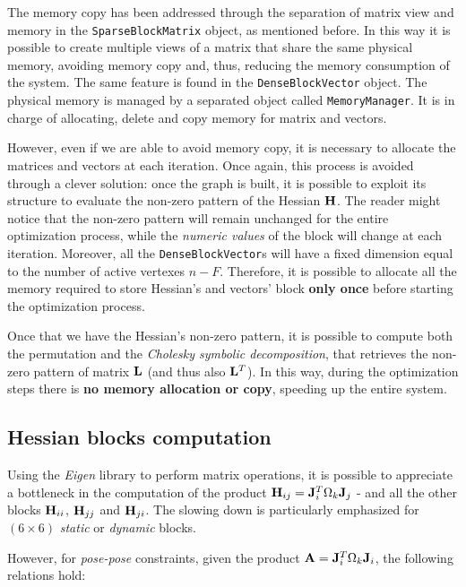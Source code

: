 The memory copy has been addressed through the separation of matrix view and memory in the \texttt{SparseBlockMatrix} object, as mentioned before. In this way it is possible to create multiple views of a matrix that share the same physical memory, avoiding memory copy and, thus, reducing the memory consumption of the system. The same feature is found in the \texttt{DenseBlockVector} object. The physical memory is managed by a separated object called \texttt{MemoryManager}. It is in charge of allocating, delete and copy memory for matrix and vectors.

However, even if we are able to avoid memory copy, it is necessary to allocate the matrices and vectors at each iteration. Once again, this process is avoided through a clever solution: once the graph is built, it is possible to exploit its structure to evaluate the non-zero pattern of the Hessian $\mathbf{H}$. The reader might notice that the non-zero pattern will remain unchanged for the entire optimization process, while the \textit{numeric values} of the block will change at each iteration. Moreover, all the \texttt{DenseBlockVector}s will have a fixed dimension equal to the number of active vertexes $n - F$. Therefore, it is possible to allocate all the memory required to store Hessian's and vectors' block \textbf{only once} before starting the optimization process.

Once that we have the Hessian's non-zero pattern, it is possible to compute both the permutation and the \textit{Cholesky symbolic decomposition}, that retrieves the non-zero pattern of matrix $\mathbf{L}$ (and thus also $\mathbf{L}^T$). In this way, during the optimization steps there is \textbf{no memory allocation or copy}, speeding up the entire system.

\subsection{Hessian blocks computation}\label{subsec:j_omega_j}
Using the \textit{Eigen} library to perform matrix operations, it is possible to appreciate a bottleneck in the computation of the product $\mathbf{H}_{ij} = \mathbf{J}_i^T \Omega_k \mathbf{J}_j$ - and all the other blocks $\mathbf{H}_{ii}$, $\mathbf{H}_{jj}$ and $\mathbf{H}_{ji}$. The slowing down is particularly emphasized for $(6\times6)$ \textit{static} or \textit{dynamic} blocks.

However, for \textit{pose-pose} constraints, given the product $\mathbf{A} = \mathbf{J}_i^T \Omega_k \mathbf{J}_i$, the following relations hold:

